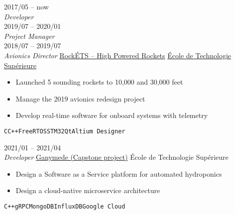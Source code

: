 \documentclass[9pt]{developercv} %
\begin{document}
\begin{minipage}[t]{0.8\textwidth}


\begin{entrylist}
	\entry
		{2017/05 -- now\\{\small\emph{Developer}}\\2019/07 -- 2020/01\\{\small\emph{Project Manager}}\\2018/07 -- 2019/07\\{\small\emph{Avionics Director}}}
		{\href{https://clubrockets.ca/en/}{RockÉTS -- High Powered Rockets}}
		{\href{https://clubrockets.ca/en/}{École de Technologie Supérieure}}
		{
			\vspace{-14pt}
			\begin{itemize}
				\renewcommand{\labelitemi}{\raisebox{.45ex}{\rule{.6ex}{.6ex}}}
				\setlength\itemsep{-1pt}
				\item Launched 5 sounding rockets to 10,000 and 30,000 feet
				\item Manage the 2019 avionics redesign project
				\item Develop real-time software for onboard systems with telemetry
			\end{itemize}
			\vspace{-4pt}
			\texttt{C}\slashsep\texttt{C++}\slashsep\texttt{FreeRTOS}\slashsep\texttt{STM32}\slashsep\texttt{Qt}\slashsep\texttt{Altium Designer}
		}
	\entry
		{2021/01 -- 2021/04\\{\small\emph{Developer}}}
		{\href{https://github.com/ngc7293/ganymede}{Ganymede (Capstone project)}}
		{École de Technologie Supérieure}
		{
			\vspace{-14pt}
			\begin{itemize}
				\renewcommand{\labelitemi}{\raisebox{.45ex}{\rule{.6ex}{.6ex}}}
				\setlength\itemsep{-1pt}
				\item Design a Software as a Service platform for automated hydroponics
				\item Design a cloud-native microservice architecture
			\end{itemize}
			\vspace{-4pt}
			\texttt{C++}\slashsep\texttt{gRPC}\slashsep\texttt{MongoDB}\slashsep\texttt{InfluxDB}\slashsep\texttt{Google Cloud}
		}
\end{entrylist}



\end{minipage}
\end{document}

